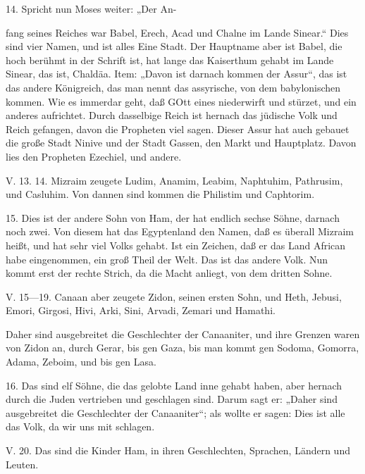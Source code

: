 14. Spricht nun Moses weiter: „Der An-

fang seines Reiches war Babel, Erech, Acad und Chalne im Lande Sinear.“ Dies sind vier Namen, und ist alles Eine Stadt. Der Hauptname aber ist Babel, die hoch berühmt in der Schrift ist, hat lange das Kaiserthum gehabt im Lande Sinear, das ist, Chaldäa. Item: „Davon ist darnach kommen der Assur“, das ist das andere Königreich, das man nennt das assyrische, von dem babylonischen kommen. Wie es immerdar geht, daß GOtt eines niederwirft und stürzet, und ein anderes aufrichtet. Durch dasselbige Reich ist hernach das jüdische Volk und Reich gefangen, davon die Propheten viel sagen. Dieser Assur hat auch gebauet die große Stadt Ninive und der Stadt Gassen, den Markt und Hauptplatz. Davon lies den Propheten Ezechiel, und andere.

\begin{schriftzitat}
V. 13. 14. Mizraim zeugete Ludim, Anamim, Leabim, Naphtuhim, Pathrusim, und Casluhim. Von dannen sind kommen die Philistim und Caphtorim.
\end{schriftzitat}

15. Dies ist der andere Sohn von Ham, der hat endlich sechse Söhne, darnach noch zwei. Von diesem hat das Egyptenland den Namen, daß es überall Mizraim heißt, und hat sehr viel Volks gehabt. Ist ein Zeichen, daß er das Land African habe eingenommen, ein groß Theil der Welt. Das ist das andere Volk. Nun kommt erst der rechte Strich, da die Macht anliegt, von dem dritten Sohne.

\begin{schriftzitat}
V. 15—19. Canaan aber zeugete Zidon, seinen ersten Sohn, und Heth, Jebusi, Emori, Girgosi, Hivi, Arki, Sini, Arvadi, Zemari und Hamathi.

Daher sind ausgebreitet die Geschlechter der Canaaniter, und ihre Grenzen waren von Zidon an, durch Gerar, bis gen Gaza, bis man kommt gen Sodoma, Gomorra, Adama, Zeboim, und bis gen Lasa.
\end{schriftzitat}

16. Das sind elf Söhne, die das gelobte Land inne gehabt haben, aber hernach durch die Juden vertrieben und geschlagen sind. Darum sagt er: „Daher sind ausgebreitet die Geschlechter der Canaaniter“; als wollte er sagen: Dies ist alle das Volk, da wir uns mit schlagen.

\begin{schriftzitat}
V. 20. Das sind die Kinder Ham, in ihren Geschlechten, Sprachen, Ländern und Leuten.
\end{schriftzitat}

